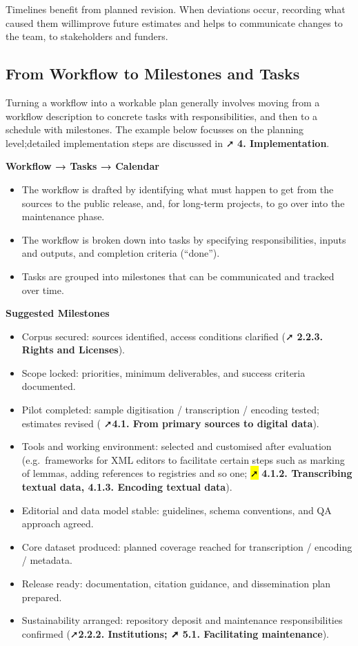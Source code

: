 \documentclass[
  letterpaper,
  DIV=11,
  numbers=noendperiod]{scrreprt}
\begin{document}
Timelines benefit from planned revision. When deviations occur,
recording what caused them willimprove future estimates and helps to
communicate changes to the team, to stakeholders and funders.

\subsection{From Workflow to Milestones and
Tasks}\label{from-workflow-to-milestones-and-tasks}

Turning a workflow into a workable plan generally involves moving from a
workflow description to concrete tasks with responsibilities, and then
to a schedule with milestones. The example below focusses on the
planning level;detailed implementation steps are discussed in ➚
\textbf{4. Implementation}.

\textbf{Workflow → Tasks → Calendar}

\begin{itemize}
\item
  The workflow is drafted by identifying what must happen to get from
  the sources to the public release, and, for long-term projects, to go
  over into the maintenance phase.
\item
  The workflow is broken down into tasks by specifying responsibilities,
  inputs and outputs, and completion criteria (``done'').
\item
  Tasks are grouped into milestones that can be communicated and tracked
  over time.
\end{itemize}

\textbf{Suggested Milestones}

\begin{itemize}
\item
  Corpus secured: sources identified, access conditions clarified (➚
  \textbf{2.2.3. Rights and Licenses}).
\item
  Scope locked: priorities, minimum deliverables, and success criteria
  documented.
\item
  Pilot completed: sample digitisation / transcription / encoding
  tested; estimates revised ( ➚\textbf{4.1. From primary sources to
  digital data}).
\item
  Tools and working environment: selected and customised after
  evaluation (e.g.~frameworks for XML editors to facilitate certain
  steps such as marking of lemmas, adding references to registries and
  so one; \hl{➚} \textbf{4.1.2. Transcribing textual data, 4.1.3.
  Encoding textual data}).
\item
  Editorial and data model stable: guidelines, schema conventions, and
  QA approach agreed.
\item
  Core dataset produced: planned coverage reached for transcription /
  encoding / metadata.
\item
  Release ready: documentation, citation guidance, and dissemination
  plan prepared.
\item
  Sustainability arranged: repository deposit and maintenance
  responsibilities confirmed (➚\textbf{2.2.2. Institutions; ➚ 5.1.
  Facilitating maintenance}).
\end{itemize}
\end{document}
